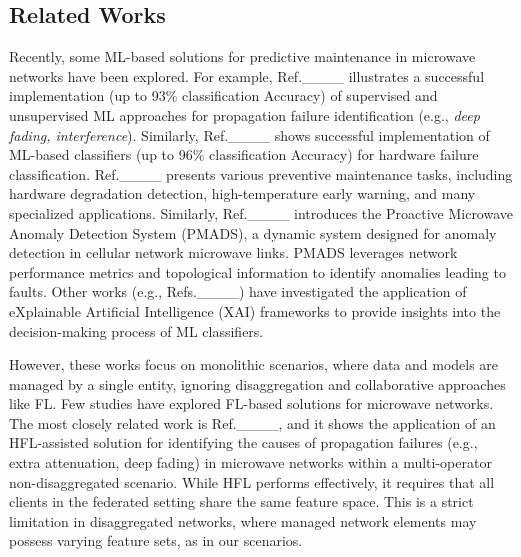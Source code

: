 \subsection{Related Works}
Recently, some ML-based solutions for predictive maintenance in microwave networks have been explored. For example, Ref.____ illustrates a successful implementation (up to 93\% classification Accuracy) of supervised and unsupervised ML approaches for propagation failure identification (e.g., \emph{deep fading, interference}). Similarly, Ref.____ shows successful implementation of ML-based classifiers (up to 96\% classification Accuracy) for hardware failure classification.   Ref.____ presents various preventive maintenance tasks, including hardware degradation detection, high-temperature early warning, and many specialized applications. 
Similarly, Ref.____ introduces the Proactive Microwave Anomaly Detection System (PMADS), a dynamic system designed for anomaly detection in cellular network microwave links. PMADS leverages network performance metrics and topological information to identify anomalies leading to faults. Other works (e.g., Refs.____) have investigated the application of eXplainable Artificial Intelligence (XAI) frameworks to provide insights into the decision-making process of ML classifiers. 

However, these works focus on monolithic scenarios, where data and models are managed by a single entity, ignoring disaggregation and collaborative approaches like FL. Few studies have explored FL-based solutions for microwave networks.
The most closely related work is Ref.____, and it shows the application of an HFL-assisted solution for identifying the causes of propagation failures (e.g., extra attenuation, deep fading) in microwave networks within a multi-operator non-disaggregated scenario. While HFL performs effectively, it requires that all clients in the federated setting share the same feature space. This is a strict limitation in disaggregated networks, where managed network elements may possess varying feature sets, as in our scenarios. 

